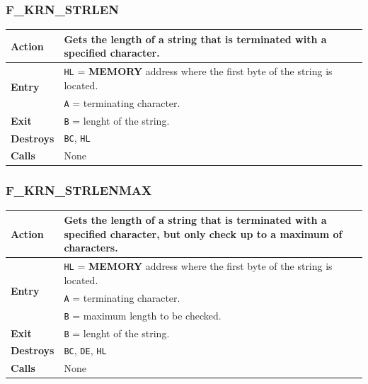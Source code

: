 \documentclass[a4paper,11pt]{article}
\begin{document}
        \subsubsection{F\_KRN\_STRLEN}
        \label{func:fkrnstrlen}
        \begin{tabular}{l p{9cm}}
            \hline\textbf{Action}
            & Gets the length of a string that is terminated with a specified
            character.\\
            \hline\multirow[t]{2}{4em}{\textbf{Entry}}
            & \texttt{HL} = \textbf{MEMORY} address where the first byte of the
            string is located.\\
            & \texttt{A} = terminating character.\\
            \hline\textbf{Exit} & \texttt{B} = lenght of the string.\\
            \hline\textbf{Destroys} & \texttt{BC}, \texttt{HL}\\
            \hline\textbf{Calls} & None\\
            \hline
        \end{tabular}

        \subsubsection{F\_KRN\_STRLENMAX}
        \label{func:fkrnstrlenmax}
        \begin{tabular}{l p{9cm}}
            \hline\textbf{Action}
            & Gets the length of a string that is terminated with a specified
            character, but only check up to a maximum of characters.\\
            \hline\multirow[t]{3}{4em}{\textbf{Entry}}
            & \texttt{HL} = \textbf{MEMORY} address where the first byte of the
            string is located.\\
            & \texttt{A} = terminating character.\\
            & \texttt{B} = maximum length to be checked.\\
            \hline\textbf{Exit} & \texttt{B} = lenght of the string.\\
            \hline\textbf{Destroys} & \texttt{BC}, \texttt{DE}, \texttt{HL}\\
            \hline\textbf{Calls} & None\\
            \hline
        \end{tabular}
\end{document}
